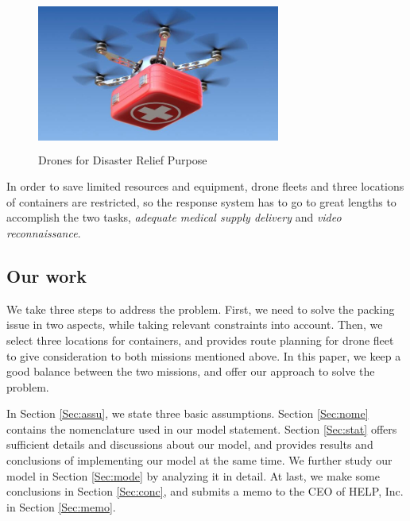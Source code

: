 \documentclass{mcmthesis}
\begin{document}
\begin{figure}[htbp]
    \centering
    \includegraphics[height=5cm,width=8cm]{figures/uavdisasterrelief.png}
    \caption{Drones for Disaster Relief Purpose}
    \label{Fig:drsd}
\end{figure}

In order to save limited resources and equipment, drone fleets and three locations of containers are restricted, so the response system has to go to great lengths to accomplish the two tasks, \emph{adequate medical supply delivery} and \emph{video reconnaissance}. 

\subsection{Our work}

We take three steps to address the problem. First, we need to solve the packing issue in two aspects, while taking relevant constraints into account. Then, we select three locations for containers, and provides route planning for drone fleet to give consideration to both missions mentioned above. In this paper, we keep a good balance between the two missions, and offer our approach to solve the problem.

In Section \ref{Sec:assu}, we state three basic assumptions. Section \ref{Sec:nome} contains the nomenclature used in our model statement. Section \ref{Sec:stat} offers sufficient details and discussions about our model, and provides results and conclusions of implementing our model at the same time. We further study our model in Section \ref{Sec:mode} by analyzing it in detail. At last, we make some conclusions in Section \ref{Sec:conc}, and submits a memo to the CEO of HELP, Inc. in Section \ref{Sec:memo}.
\end{document}
